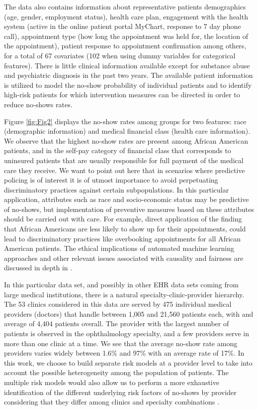 \documentclass[twoside,11pt]{article}
\begin{document}
The data also contains information about representative patients demographics (age, gender, employment status), health care plan, engagement with the health system (active in the online patient portal MyChart, response to 7 day phone call), appointment type (how long the appointment was held for, the location of the appointment), patient response to appointment confirmation among others, for a total of 67 covariates (102 when using dummy variables for categorical features). There is little clinical information available except for substance abuse and psychiatric diagnosis in the past two years. The available patient information is utilized to model the no-show probability of individual patients and to identify high-risk patients for which intervention measures can be directed in order to reduce no-shows rates. 

Figure \ref{fig:Fig2} displays the no-show rates among groups for two features: race (demographic information) and medical financial class (health care information). We observe that the highest no-show rates are present among African American patients, and in the self-pay category of financial class that corresponds to uninsured patients that are usually responsible for full payment of the medical care they receive. We want to point out here that in scenarios where predictive policing is of interest it is of utmost importance to avoid perpetuating discriminatory practices against certain subpopulations. In this particular application, attributes such as race and socio-economic status may be predictive of no-shows, but implementation of preventive measures based on these attributes should be carried out with care. For example, direct application of the finding that African Americans are less likely to show up for their appointments, could lead to discriminatory practices like overbooking appointments for all African American patients. The ethical implications of automated machine learning approaches and other relevant issues associated with causality and fairness are discussed in depth in \cite{Kusner17}.

In this particular data set, and possibly in other EHR data sets coming from large medical institutions, there is a natural specialty-clinic-provider hierarchy. The 53 clinics considered in this data are served  by 475 individual medical providers (doctors) that handle between 1,005 and 21,560 patients each, with and average of 4,404 patients overall. The provider with the largest number of patients is observed in the ophthalmology specialty, and a few providers serve in more than one clinic at a time. We see that the average no-show rate among providers varies widely between 1.6\% and 97\% with an average rate of 17\%. In this work, we choose to build separate risk models at a provider level to take into account the possible heterogeneity among the population of patients. The multiple risk models would also allow us to perform a more exhaustive identification of the different underlying risk factors of no-shows by provider considering that they differ among clinics and specialty combinations \citep{Ben18}. 
\end{document}
